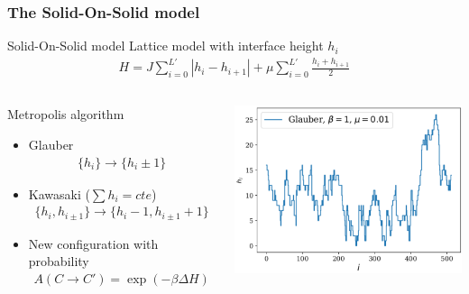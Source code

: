 \documentclass[9pt, dvipsnames]{beamer} %
\begin{document}
\begin{frame}
    \frametitle{The Solid-On-Solid model}
    \begin{block}{Solid-On-Solid model}
    	Lattice model with interface height $h_i$
    	\begin{align}
	    	H = J \sum_{i=0}^{L'} |h_i-h_{i+1}| + \mu \sum_{i=0}^{L'} \frac{h_i+h_{i+1}}{2}
    	\end{align}
    \end{block}
    \begin{columns}
	\begin{block}{Metropolis algorithm}
		\begin{itemize}
			\item Glauber 
			\begin{align}
				\{h_i\} \to  \{h_i \pm 1\} 
			\end{align}
			\item Kawasaki ($\sum h_i = cte$)
			\begin{align}
				\{h_i,h_{i\pm 1} \} \to \{h_i-1,h_{i \pm 1}+1\} 
			\end{align}			
			\item New configuration with probability 
			\begin{align}A(C\to C') = \exp(-\beta \Delta H)
			\end{align}
		\end{itemize}
	\end{block}
    \centering
	\includegraphics[scale=0.4]{snap-sos.pdf}
    \end{columns}
\end{frame}
\end{document}
